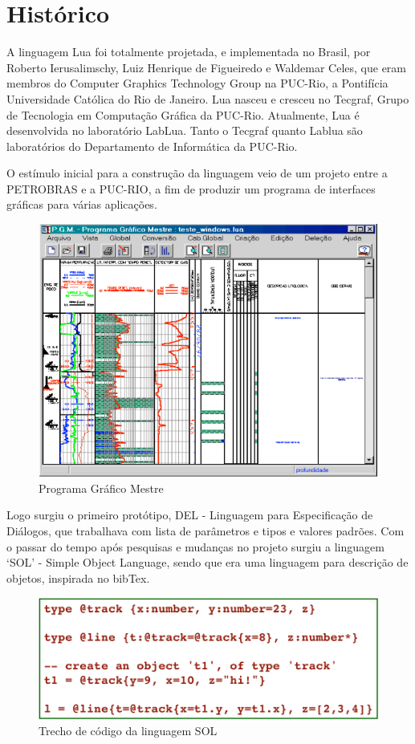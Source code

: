 \documentclass[
12pt, %
openright, %
oneside, %
a4paper, %
english, %
brazil, %
]{abntex2}
\begin{document}
\chapter{Histórico}
A linguagem Lua foi totalmente projetada, e implementada no Brasil, por Roberto Ierusalimschy, Luiz Henrique de Figueiredo e Waldemar Celes, que eram membros do Computer Graphics Technology Group na PUC-Rio, a Pontifícia Universidade Católica do Rio de Janeiro. Lua nasceu e cresceu no Tecgraf, Grupo de Tecnologia em Computação Gráfica da PUC-Rio. Atualmente, Lua é desenvolvida no laboratório LabLua. Tanto o Tecgraf quanto Lablua são laboratórios do Departamento de Informática da PUC-Rio.

O estímulo inicial para a construção da linguagem veio de um projeto entre a PETROBRAS e a PUC-RIO, a fim de produzir um programa de interfaces gráficas para várias aplicações.

\begin{figure}[H]
\centering
\includegraphics[width=0.5\linewidth]{imagens/imagem1.png}
\caption{Programa Gráfico Mestre}
\end{figure}

Logo surgiu o primeiro protótipo, DEL - Linguagem para Especificação de Diálogos, que trabalhava com lista de parâmetros e tipos e valores padrões. Com o passar do tempo após pesquisas e mudanças no projeto surgiu a linguagem `SOL' - Simple Object Language, sendo que era uma linguagem para descrição de objetos, inspirada no bibTex.

\begin{figure}[H]
\centering
\includegraphics[width=0.5\linewidth]{imagens/imagem2.png}
\caption{Trecho de código da linguagem SOL}
\end{figure}
\end{document}
